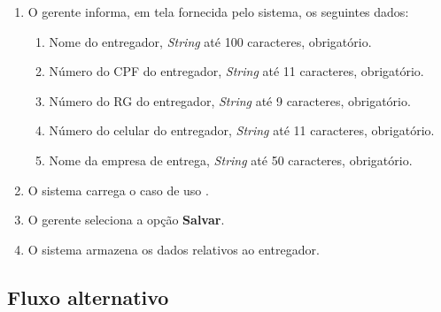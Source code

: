 \begin{enumerate}
	\item O gerente informa, em tela fornecida pelo sistema, os seguintes dados:
	\begin{enumerate}
		\item Nome do entregador, \emph{String} até 100 caracteres, obrigatório.
		\item Número do CPF do entregador, \emph{String} até 11 caracteres, obrigatório.
		\item Número do RG do entregador, \emph{String} até 9 caracteres, obrigatório.
		\item Número do celular do entregador, \emph{String} até 11 caracteres, obrigatório.	
		\item Nome da empresa de entrega, \emph{String} até 50 caracteres, obrigatório.
	\end{enumerate}
	\item O sistema carrega o caso de uso .
	\item O gerente seleciona a opção \textbf{Salvar}.
	\item O sistema armazena os dados relativos ao entregador.
\end{enumerate}

\subsection{Fluxo alternativo}

